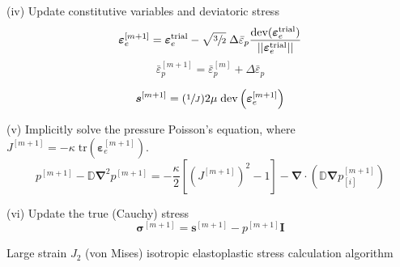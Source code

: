 \documentclass[sn-mathphys,Numbered,draft]{sn-jnl}%
\newcommand{\bb}{\boldsymbol}
\begin{document}
\begin{algorithm}[htb]
(iv) Update constitutive variables and deviatoric stress
\begin{equation}
	\boldsymbol{\varepsilon}_{e}^{[m+1]}
	=
	\boldsymbol{\varepsilon}_{e}^{\text{trial}}
	- \sqrt{\sfrac{3}{2}} \; \Delta\bar{\varepsilon}_p
	\frac{\text{dev}(\boldsymbol{\varepsilon}_{e}^{\text{trial}})}{||\boldsymbol{\varepsilon}_{e}^{\text{trial}}||}
	\nonumber
\end{equation}
\begin{equation}
	\bar{\varepsilon}_p^{[m+1]} = \bar{\varepsilon}_p^{[m]} + \Delta\bar{\varepsilon}_p \nonumber
\end{equation}

\begin{equation}
	\boldsymbol{s}^{[m+1]}
	=
	(\sfrac{1}{J}) 2\mu \;\text{dev}\left(\boldsymbol{\varepsilon}_{e}^{[m+1]}\right) \nonumber
\end{equation}

(v) Implicitly solve the pressure Poisson's equation, where $J^{[m+1]} = -\kappa \; \text{tr}\left(\boldsymbol{\varepsilon}_{e}^{[m+1]}\right)$.
\begin{equation}
	p^{[m+1]} - \mathbb{D} \bb{\nabla}^2 p^{[m+1]} = -\frac{\kappa}{2} \left[\left(J^{[m+1]}\right)^{2} - 1\right] - \bb{\nabla} \cdot \left( \mathbb{D} \bb{\nabla} p^{[m+1]}_{[i]} \right)
\end{equation}


(vi) Update the true (Cauchy) stress
\begin{equation}
	\boldsymbol{\sigma}^{[m+1]} = \boldsymbol{s}^{[m+1]} -  p^{[m+1]}\textbf{I} \nonumber
\end{equation}

\caption{Large strain $J_2$ (von Mises) isotropic elastoplastic stress calculation algorithm \citep{de_souza_neto_computational_2008} }
\end{algorithm}






\end{document}
